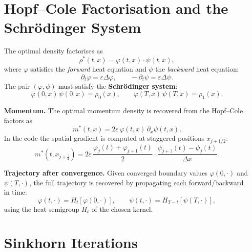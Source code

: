\documentclass[11pt]{article}
\newcommand{\eps}{\varepsilon}
\newcommand{\dx}{\Delta x}
\theoremstyle{remark}
\begin{document}
\section{Hopf--Cole Factorisation and the Schr\"odinger System}

The optimal density factorises as
\begin{equation}
  \rho^*(t, x) = \varphi(t,x) \cdot \psi(t,x),
\end{equation}
where $\varphi$ satisfies the \textit{forward} heat equation and $\psi$ the
\textit{backward} heat equation:
\begin{equation}
  \partial_t \varphi = \eps \Delta \varphi, \qquad
  -\partial_t \psi  = \eps \Delta \psi.
\end{equation}
The pair $(\varphi, \psi)$ must satisfy the \textbf{Schr\"odinger system}:
\begin{equation}
  \varphi(0,x)\, \psi(0,x) = \rho_0(x), \qquad
  \varphi(T,x)\, \psi(T,x) = \rho_1(x).
\end{equation}

\textbf{Momentum.}
The optimal momentum density is recovered from the Hopf--Cole factors as
\begin{equation}
  m^*(t,x) = 2\eps\, \varphi(t,x)\, \partial_x \psi(t,x).
\end{equation}
In the code the spatial gradient is computed at staggered positions $x_{j+1/2}$:
\begin{equation}
  m^*(t, x_{j+\frac{1}{2}})
  = 2\eps\, \frac{\varphi_j(t) + \varphi_{j+1}(t)}{2}
             \cdot \frac{\psi_{j+1}(t) - \psi_j(t)}{\dx}.
\end{equation}

\textbf{Trajectory after convergence.}
Given converged boundary values $\varphi(0,\cdot)$ and $\psi(T,\cdot)$, the full
trajectory is recovered by propagating each forward/backward in time:
\begin{equation}
  \varphi(t,\cdot) = H_t[\varphi(0,\cdot)], \qquad
  \psi(t,\cdot) = H_{T-t}[\psi(T,\cdot)],
\end{equation}
using the heat semigroup $H_t$ of the chosen kernel.

\section{Sinkhorn Iterations}
\end{document}
